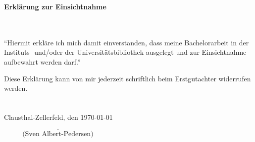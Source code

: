 \newpage
\thispagestyle{empty}
\begin{center}
\LARGE\bfseries Erklärung zur Einsichtnahme\linebreak[4]
\end{center}
\noindent\\\\
\indent
\enquote{Hiermit erkläre ich mich damit einverstanden, dass meine Bachelorarbeit in der Instituts- und/oder der Universitätsbibliothek ausgelegt und zur Einsichtnahme aufbewahrt werden darf.}
%
%

Diese Erklärung kann von mir jederzeit schriftlich beim Erstgutachter widerrufen werden.\\\\\\

\noindent Clausthal-Zellerfeld, den \today
\begin{flushright}
$\overline{~~~~~~~~~~~~\mbox{(Sven Albert-Pedersen)}~~~~~~~~~~~~}$
\end{flushright}